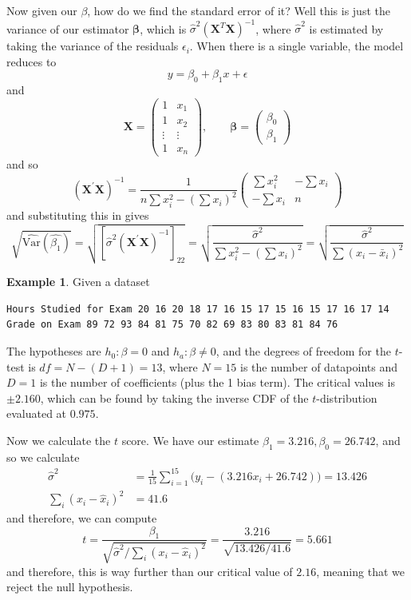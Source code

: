 \documentclass{article}
\theoremstyle{definition}
\newtheorem{example}{Example}[section]
\theoremstyle{remark}
\theoremstyle{definition}
\begin{document}
Now given our $\beta$, how do we find the standard error of it? Well this is just the variance of our estimator $\boldsymbol{\beta}$, which is $\hat{\sigma}^2 (\mathbf{X}^T \mathbf{X})^{-1}$, where $\hat{\sigma}^2$ is estimated by taking the variance of the residuals $\epsilon_i$. When there is a single variable, the model reduces to 
\[y = \beta_0 + \beta_1 x + \epsilon\]
and 
\[\mathbf{X} = \left(
\begin{array}{cc}
1 & x_1 \\
1 & x_2 \\
\vdots & \vdots \\
1 & x_n
\end{array}
\right), \qquad \boldsymbol{\beta} = \left(
\begin{array}{c}
\beta_0 \\ \beta_1 
\end{array}
\right)\]
and so 
\[(\mathbf{X}^{\prime} \mathbf{X})^{-1} = \frac{1}{n\sum x_i^2 - (\sum x_i)^2} 
\left(
\begin{array}{cc}
\sum x_i^2 & -\sum x_i \\
-\sum x_i  & n
\end{array}
\right)\]
and substituting this in gives 
\[\sqrt{\widehat{\textrm{Var}}(\hat{\beta_1})} = \sqrt{[\hat{\sigma}^2  (\mathbf{X}^{\prime} \mathbf{X})^{-1}]_{22}} = \sqrt{\frac{\hat{\sigma}^2}{\sum x_i^2 - (\sum x_i)^2}} = \sqrt{\frac{\hat{\sigma}^2}{\sum (x_i - \bar{x}_i)^2}}\]

\begin{example}
Given a dataset 
\begin{verbatim}
Hours Studied for Exam 20 16 20 18 17 16 15 17 15 16 15 17 16 17 14
Grade on Exam 89 72 93 84 81 75 70 82 69 83 80 83 81 84 76
\end{verbatim}
The hypotheses are $h_0 : \beta = 0$ and $h_a : \beta \neq 0$, and the degrees of freedom for the $t$-test is $df = N - (D + 1) = 13$, where $N = 15$ is the number of datapoints and $D = 1$ is the number of coefficients (plus the 1 bias term). The critical values is $\pm 2.160$, which can be found by taking the inverse CDF of the $t$-distribution evaluated at $0.975$. 

Now we calculate the $t$ score. We have our estimate $\beta_1 = 3.216, \beta_0 = 26.742$, and so we calculate 
\begin{align*}
    \hat{\sigma}^2 & = \frac{1}{15} \sum_{i=1}^{15} \big( y_i - (3.216 x_i + 26.742) \big) = 13.426 \\
    \sum_{i} (x_i - \hat{x}_i)^2 & = 41.6 
\end{align*}
and therefore, we can compute 
\[t = \frac{\beta_1}{\sqrt{\hat{\sigma}^2 /  \sum_{i} (x_i - \hat{x}_i)^2}} = \frac{3.216}{\sqrt{13.426/41.6}} = 5.661\]
and therefore, this is way further than our critical value of $2.16$, meaning that we reject the null hypothesis. 
\end{example}
\end{document}
